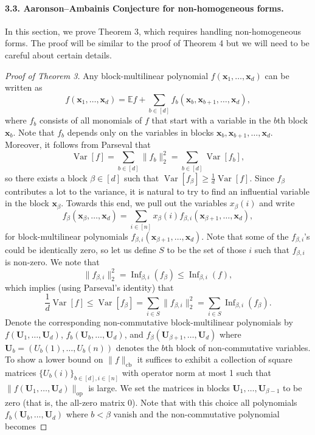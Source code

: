 \documentclass[10pt,a4paper]{article}
\begin{document}
\paragraph{3.3. Aaronson--Ambainis Conjecture for non-homogeneous forms.}
In this section, we prove Theorem 3, which requires handling non-homogeneous forms. The proof will be similar to the proof of Theorem 4 but we will need to be careful about certain details.
\begin{proof}[Proof of Theorem 3]
Any block-multilinear polynomial $f(\mathbf x_1,\ldots,\mathbf x_d)$ can be written as
\[f(\mathbf x_1,\ldots,\mathbf x_d)=\mathbb Ef+\sum_{b\in[d]}f_b(\mathbf x_b,\mathbf x_{b+1},\ldots,\mathbf x_d),\]
where $f_b$ consists of all monomials of $f$ that start with a variable in the $b$th block $\mathbf x_b$. Note that $f_b$ depends only on the variables in blocks $\mathbf x_b,\mathbf x_{b+1},\ldots,\mathbf x_d$. Moreover, it follows from Parseval that
\[\operatorname{Var}[f]=\sum_{b\in[d]}\|f_b\|_2^2=\sum_{b\in[d]}\operatorname{Var}[f_b],\tag{9}\]
so there exists a block $\beta\in[d]$ such that $\operatorname{Var}[f_\beta]\geq\frac1d\operatorname{Var}[f]$.
Since $f_\beta$ contributes a lot to the variance, it is natural to try to find an influential variable in the block $\mathbf x_\beta$. Towards this end, we pull out the variables $x_\beta(i)$ and write
\[f_\beta(\mathbf x_\beta,\ldots,\mathbf x_d)=\sum_{i\in[n]}x_\beta(i)f_{\beta,i}(\mathbf x_{\beta+1},\ldots,\mathbf x_d),\]
for block-multilinear polynomials $f_{\beta,i}(\mathbf x_{\beta+1},\ldots,\mathbf x_d)$. Note that some of the $f_{\beta,i}$'s could be identically zero, so let us define $S$ to be the set of those $i$ such that $f_{\beta,i}$ is non-zero. We note that
\[\|f_{\beta,i}\|_2^2=\operatorname{Inf}_{\beta,i}(f_\beta)\leq\operatorname{Inf}_{\beta,i}(f),\tag{10}\]
which implies (using Parseval's identity) that
\[\frac1d\operatorname{Var}[f]\leq\operatorname{Var}[f_\beta]=\sum_{i\in S}\|f_{\beta,i}\|_2^2=\sum_{i\in S}\operatorname{Inf}_{\beta,i}(f_\beta).\tag{11}\]
Denote the corresponding non-commutative block-multilinear polynomials by $f(\mathbf U_1,\ldots,\mathbf U_d)$, $f_b(\mathbf U_b,\ldots,\mathbf U_d)$, and $f_\beta(\mathbf U_{\beta+1},\ldots,\mathbf U_d)$ where $\mathbf U_b=(U_b(1),\ldots,U_b(n))$ denotes the $b$th block of non-commutative variables. To show a lower bound on $\|f\|_{\mathrm{cb}}$ it suffices to exhibit a collection of square matrices $\{U_b(i)\}_{b\in[d],i\in[n]}$ with operator norm at most 1 such that $\|f(\mathbf U_1,\ldots,\mathbf U_d)\|_{\mathrm{op}}$ is large.
We set the matrices in blocks $\mathbf U_1,\ldots,\mathbf U_{\beta-1}$ to be zero (that is, the all-zero matrix $0$). Note that with this choice all polynomials $f_b(\mathbf U_b,\ldots,\mathbf U_d)$ where $b<\beta$ vanish and the non-commutative polynomial becomes

\end{proof}
\end{document}
